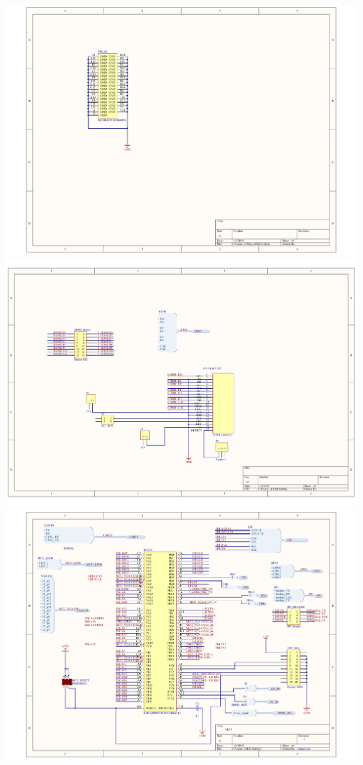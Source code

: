 \documentclass[../main/report.tex]{subfiles}
\begin{document}
\newpage
\includegraphics[width=\paperwidth]{../appendix/PCB_schematics/FPGA_GND.PDF}
\newpage
\includegraphics[width=\paperwidth]{../appendix/PCB_schematics/HDMI.PDF}
\newpage
\includegraphics[width=\paperwidth]{../appendix/PCB_schematics/MCU.PDF}
\end{document}
